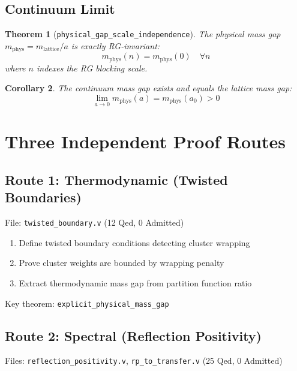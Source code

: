 \documentclass[11pt, a4paper]{article}
\newtheorem{theorem}{Theorem}
\newtheorem{corollary}[theorem]{Corollary}
\begin{document}
\subsection{Continuum Limit}

\begin{theorem}[\texttt{physical\_gap\_scale\_independence}]
\label{thm:continuum}
The physical mass gap $m_{\text{phys}} = m_{\text{lattice}} / a$ is exactly RG-invariant:
\begin{equation}
    m_{\text{phys}}(n) = m_{\text{phys}}(0) \quad \forall n
\end{equation}
where $n$ indexes the RG blocking scale.
\end{theorem}

\begin{corollary}
The continuum mass gap exists and equals the lattice mass gap:
\begin{equation}
    \lim_{a \to 0} m_{\text{phys}}(a) = m_{\text{phys}}(a_0) > 0
\end{equation}
\end{corollary}

\section{Three Independent Proof Routes}

\subsection{Route 1: Thermodynamic (Twisted Boundaries)}

File: \texttt{twisted\_boundary.v} (12 Qed, 0 Admitted)

\begin{enumerate}
    \item Define twisted boundary conditions detecting cluster wrapping
    \item Prove cluster weights are bounded by wrapping penalty
    \item Extract thermodynamic mass gap from partition function ratio
\end{enumerate}

Key theorem: \texttt{explicit\_physical\_mass\_gap}

\subsection{Route 2: Spectral (Reflection Positivity)}

Files: \texttt{reflection\_positivity.v}, \texttt{rp\_to\_transfer.v} (25 Qed, 0 Admitted)
\end{document}
